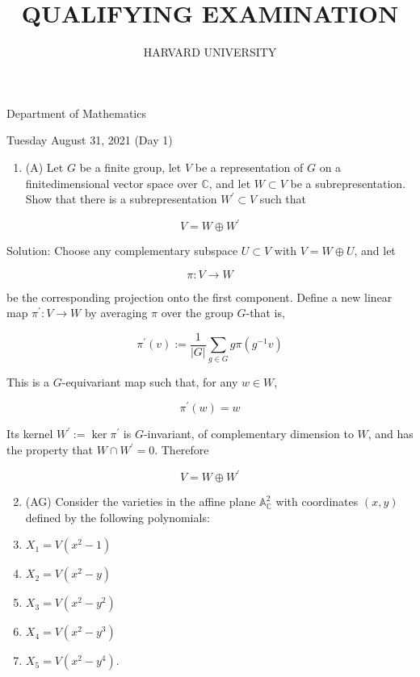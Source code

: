 \documentclass[10pt]{article}
\title{QUALIFYING EXAMINATION }
\author{HARVARD UNIVERSITY}
\date{}
\begin{document}
\maketitle
Department of Mathematics

Tuesday August 31, 2021 (Day 1)

\begin{enumerate}
  \item (A) Let $G$ be a finite group, let $V$ be a representation of $G$ on a finitedimensional vector space over $\mathbb{C}$, and let $W \subset V$ be a subrepresentation. Show that there is a subrepresentation $W^{\prime} \subset V$ such that
\end{enumerate}

$$
V=W \oplus W^{\prime}
$$

Solution: Choose any complementary subspace $U \subset V$ with $V=W \oplus U$, and let

$$
\pi: V \longrightarrow W
$$

be the corresponding projection onto the first component. Define a new linear map $\pi^{\prime}: V \longrightarrow W$ by averaging $\pi$ over the group $G$-that is,

$$
\pi^{\prime}(v):=\frac{1}{|G|} \sum_{g \in G} g \pi\left(g^{-1} v\right)
$$

This is a $G$-equivariant map such that, for any $w \in W$,

$$
\pi^{\prime}(w)=w
$$

Its kernel $W^{\prime}:=\operatorname{ker} \pi^{\prime}$ is $G$-invariant, of complementary dimension to $W$, and has the property that $W \cap W^{\prime}=0$. Therefore

$$
V=W \oplus W^{\prime}
$$

\begin{enumerate}
  \setcounter{enumi}{1}
  \item (AG) Consider the varieties in the affine plane $\mathbb{A}_{\mathbb{C}}^{2}$ with coordinates $(x, y)$ defined by the following polynomials:

  \item $X_{1}=V\left(x^{2}-1\right)$

  \item $X_{2}=V\left(x^{2}-y\right)$

  \item $X_{3}=V\left(x^{2}-y^{2}\right)$

  \item $X_{4}=V\left(x^{2}-y^{3}\right)$

  \item $X_{5}=V\left(x^{2}-y^{4}\right)$.

\end{enumerate}
\end{document}
